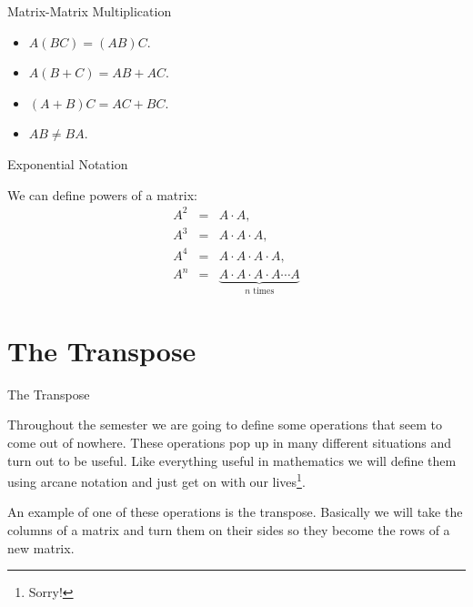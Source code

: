 \documentclass[svgnames,table,,aspectratio=169]{beamer}
\begin{document}
\begin{frame}{Matrix-Matrix Multiplication}

  \begin{itemize}
  \item $A(BC)=(AB)C$.
  \item $A(B+C)=AB+AC$.
  \item $(A+B)C=AC+BC$.
  \item<2-> $AB\neq BA$. 
  \end{itemize}
  
\end{frame}

\begin{frame}{Exponential Notation}

  We can define powers of a matrix:
  \begin{eqnarray*}
    A^2 & = & A\cdot A, \\
    A^3 & = & A\cdot A \cdot A, \\
    A^4 & = & A\cdot A  \cdot A  \cdot A, \\
    A^n & = & \underbrace{A  \cdot A  \cdot A  \cdot A \cdots A}_\text{$n$~times}
  \end{eqnarray*}
  
\end{frame}

\section{The Transpose}

\newcommand{\rowFour}[4]{
  #1 & #2 & #3 & #4
}

\newcommand{\threeRows}[3]{
  \left[
    \begin{array}{rrrr}
      #1 \\
      #2 \\
      #3 
    \end{array}
  \right]
}


\begin{frame}{The Transpose}

  Throughout the semester we are going to define some operations that
  seem to come out of nowhere. These operations pop up in many
  different situations and turn out to be useful. Like everything
  useful in mathematics we will define them using arcane notation and
  just get on with our lives\footnote{Sorry!}.

  An example of one of these operations is the transpose. Basically we
  will take the columns of a matrix and turn them on their sides so
  they become the rows of a new matrix.
  
\end{frame}
\end{document}
